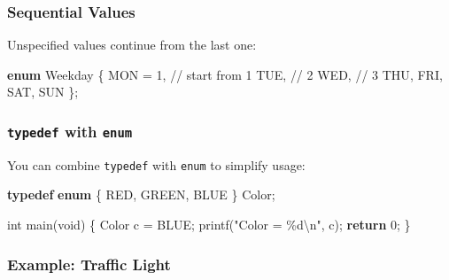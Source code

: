 \documentclass[
  letterpaper,
  DIV=11,
  numbers=noendperiod]{scrreprt}
\newenvironment{Shaded}{\begin{snugshade}}{\end{snugshade}}
\newcommand{\CommentTok}[1]{\textcolor[rgb]{0.37,0.37,0.37}{#1}}
\newcommand{\ControlFlowTok}[1]{\textcolor[rgb]{0.00,0.23,0.31}{\textbf{#1}}}
\newcommand{\DataTypeTok}[1]{\textcolor[rgb]{0.68,0.00,0.00}{#1}}
\newcommand{\DecValTok}[1]{\textcolor[rgb]{0.68,0.00,0.00}{#1}}
\newcommand{\KeywordTok}[1]{\textcolor[rgb]{0.00,0.23,0.31}{\textbf{#1}}}
\newcommand{\NormalTok}[1]{\textcolor[rgb]{0.00,0.23,0.31}{#1}}
\newcommand{\OperatorTok}[1]{\textcolor[rgb]{0.37,0.37,0.37}{#1}}
\newcommand{\SpecialCharTok}[1]{\textcolor[rgb]{0.37,0.37,0.37}{#1}}
\newcommand{\StringTok}[1]{\textcolor[rgb]{0.13,0.47,0.30}{#1}}
\begin{document}
\subsubsection{Sequential Values}\label{sequential-values}

Unspecified values continue from the last one:

\begin{Shaded}
\begin{Highlighting}[]
\KeywordTok{enum}\NormalTok{ Weekday }\OperatorTok{\{}
\NormalTok{    MON }\OperatorTok{=} \DecValTok{1}\OperatorTok{,}  \CommentTok{// start from 1}
\NormalTok{    TUE}\OperatorTok{,}      \CommentTok{// 2}
\NormalTok{    WED}\OperatorTok{,}      \CommentTok{// 3}
\NormalTok{    THU}\OperatorTok{,}\NormalTok{ FRI}\OperatorTok{,}\NormalTok{ SAT}\OperatorTok{,}\NormalTok{ SUN}
\OperatorTok{\};}
\end{Highlighting}
\end{Shaded}

\subsubsection{\texorpdfstring{\texttt{typedef} with
\texttt{enum}}{typedef with enum}}\label{typedef-with-enum}

You can combine \texttt{typedef} with \texttt{enum} to simplify usage:

\begin{Shaded}
\begin{Highlighting}[]
\KeywordTok{typedef} \KeywordTok{enum} \OperatorTok{\{}
\NormalTok{    RED}\OperatorTok{,}\NormalTok{ GREEN}\OperatorTok{,}\NormalTok{ BLUE}
\OperatorTok{\}}\NormalTok{ Color}\OperatorTok{;}

\DataTypeTok{int}\NormalTok{ main}\OperatorTok{(}\DataTypeTok{void}\OperatorTok{)} \OperatorTok{\{}
\NormalTok{    Color c }\OperatorTok{=}\NormalTok{ BLUE}\OperatorTok{;}
\NormalTok{    printf}\OperatorTok{(}\StringTok{"Color = }\SpecialCharTok{\%d\textbackslash{}n}\StringTok{"}\OperatorTok{,}\NormalTok{ c}\OperatorTok{);}
    \ControlFlowTok{return} \DecValTok{0}\OperatorTok{;}
\OperatorTok{\}}
\end{Highlighting}
\end{Shaded}

\subsubsection{Example: Traffic Light}\label{example-traffic-light}
\end{document}
